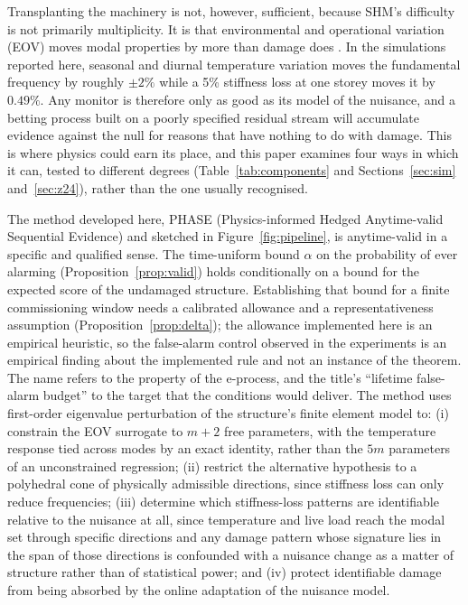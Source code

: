 \documentclass[12pt,a4paper]{article}
\newcommand{\rev}[1]{#1}
\newcommand{\rev}[1]{{\color{revcol}#1}}
\newcommand{\rtwo}[1]{#1}
\newcommand{\rtwo}[1]{{\color{revcolb}#1}}
\begin{document}
Transplanting the machinery is not, however, sufficient, because SHM's difficulty is not primarily multiplicity. It is that environmental and operational variation (EOV) moves modal properties by more than damage does \citep{sohn2007eov,peeters2001z24}. In the simulations reported here, seasonal and diurnal temperature variation moves the fundamental frequency by roughly $\pm2\%$ while a 5\% stiffness loss at one storey moves it by $0.49\%$. Any monitor is therefore only as good as its model of the nuisance, and a betting process built on a poorly specified residual stream will accumulate evidence against the null for reasons that have nothing to do with damage. This is where physics could earn its place, and this paper \rev{examines} four ways \rev{in which it can, tested to different degrees (Table~\ref{tab:components} and Sections~\ref{sec:sim} and~\ref{sec:z24}),} rather than the one usually recognised.

\color{revcolb}The method developed here, PHASE (Physics-informed Hedged Anytime-valid Sequential Evidence) and sketched in Figure~\ref{fig:pipeline}, \rev{is anytime-valid in a specific and qualified sense.\color{revcol} \rtwo{The time-uniform bound $\alpha$ on the probability of ever alarming (Proposition~\ref{prop:valid}) holds conditionally on a bound for the expected score of the undamaged structure.} \rtwo{Establishing that bound for a finite commissioning window needs a calibrated allowance and a representativeness assumption (Proposition~\ref{prop:delta}); the allowance implemented here is an empirical heuristic, so the false-alarm control observed in the experiments is an empirical finding about the implemented rule and not an instance of the theorem.} \rtwo{The name refers to the property of the e-process, and the title's ``lifetime false-alarm budget'' to the target that the conditions would deliver.} \color{revcolb}The method} uses first-order eigenvalue perturbation of the structure's finite element model to: (i) constrain the EOV surrogate to $m+2$ free parameters, with the temperature response tied across modes by an exact identity, rather than the $5m$ parameters of an unconstrained regression; (ii) restrict the alternative hypothesis to a polyhedral cone of physically admissible directions, since stiffness loss can only reduce frequencies; (iii) determine which stiffness-loss patterns are identifiable \rev{relative to the nuisance} at all, since temperature \rev{and live load reach} the modal set through specific directions and any damage pattern whose signature lies in the span of those directions is confounded with a nuisance change as a matter of structure rather than of statistical power; and (iv) protect identifiable damage from being absorbed by the online adaptation of the nuisance model.\color{black}
\end{document}
